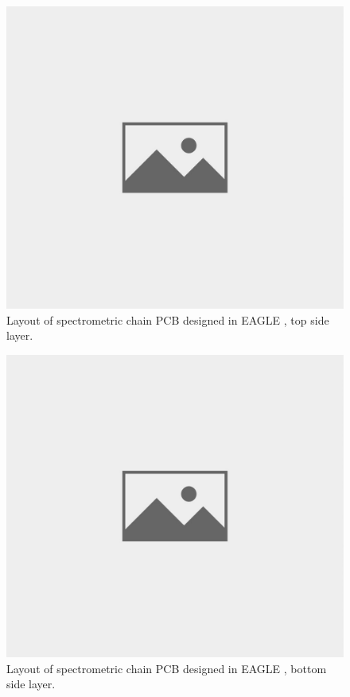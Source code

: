 \begin{figure}[H]
 \centering
 \includegraphics[scale=0.35, angle = 0]{./pictures/NoPicture.jpg}
 \caption{Layout of spectrometric chain PCB designed in EAGLE \cite{eagle}, top side layer.}
 \label{layout top}
 
\end{figure}

\begin{figure}[H]
 \centering
 \includegraphics[scale=0.35, angle = 0]{./pictures/NoPicture.jpg}
 \caption{Layout of spectrometric chain PCB designed in EAGLE \cite{eagle}, bottom side layer.}
 \label{layout bottom}
 
\end{figure}






